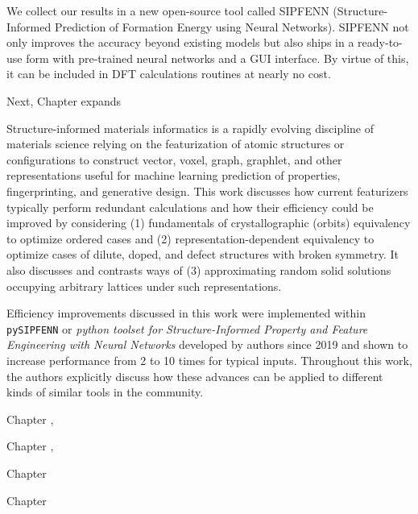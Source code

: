 We collect our results in a new open-source tool called SIPFENN (Structure-Informed Prediction of Formation Energy using Neural Networks). SIPFENN not only improves the accuracy beyond existing models but also ships in a ready-to-use form with pre-trained neural networks and a GUI  interface. By virtue of this, it can be included in DFT calculations routines at nearly no cost.

Next, Chapter  expands


Structure-informed materials informatics is a rapidly evolving discipline of materials science relying on the featurization of atomic structures or configurations to construct vector, voxel, graph, graphlet, and other representations useful for machine learning prediction of properties, fingerprinting, and generative design. This work discusses how current featurizers typically perform redundant calculations and how their efficiency could be improved by considering (1) fundamentals of crystallographic (orbits) equivalency to optimize ordered cases and (2) representation-dependent equivalency to optimize cases of dilute, doped, and defect structures with broken symmetry. It also discusses and contrasts ways of (3) approximating random solid solutions occupying arbitrary lattices under such representations.

Efficiency improvements discussed in this work were implemented within \texttt{pySIPFENN} or \textit{python toolset for Structure-Informed Property and Feature Engineering with Neural Networks} developed by authors since 2019 and shown to increase performance from 2 to 10 times for typical inputs. Throughout this work, the authors explicitly discuss how these advances can be applied to different kinds of similar tools in the community.





Chapter ,






Chapter ,






Chapter 





Chapter 


